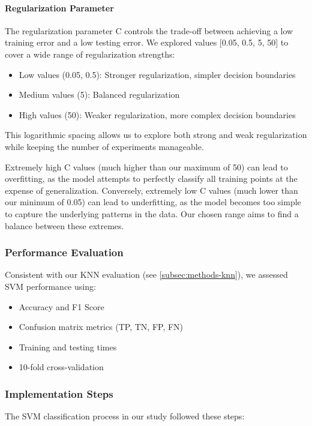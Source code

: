 \paragraph{Regularization Parameter}
The regularization parameter C controls the trade-off between achieving a low training error and a low testing error. 
We explored values [0.05, 0.5, 5, 50] to cover a wide range of regularization strengths:
\begin{itemize}
    \item Low values (0.05, 0.5): Stronger regularization, simpler decision boundaries
    \item Medium values (5): Balanced regularization
    \item High values (50): Weaker regularization, more complex decision boundaries
\end{itemize}
This logarithmic spacing allows us to explore both strong and weak regularization while keeping the number of experiments manageable.

Extremely high C values (much higher than our maximum of 50) can lead to overfitting, as the model attempts to perfectly classify all training points at the expense of generalization. Conversely, extremely low C values (much lower than our minimum of 0.05) can lead to underfitting, as the model becomes too simple to capture the underlying patterns in the data. Our chosen range aims to find a balance between these extremes.

\subsubsection{Performance Evaluation}
Consistent with our KNN evaluation (see \autoref{subsec:methods-knn}), we assessed SVM performance using:
\begin{itemize}
    \item Accuracy and F1 Score
    \item Confusion matrix metrics (TP, TN, FP, FN)
    \item Training and testing times
    \item 10-fold cross-validation
\end{itemize}

\subsubsection{Implementation Steps}

The SVM classification process in our study followed these steps:

